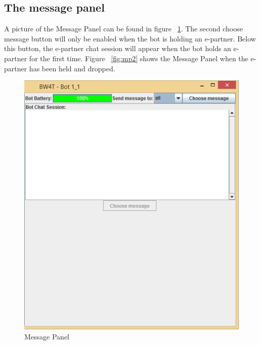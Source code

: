 \subsection{The message panel}
A picture of the Message Panel can be found in figure ~\ref{fig:mp1}. The second choose message button will only be enabled when the bot is holding an e-partner. Below this button, the e-partner chat session will appear when the bot holds an e-partner for the first time. Figure ~\ref{fig:mp2} shows the Message Panel when the e-partner has been held and dropped.
\\
\begin{figure}[h]
\begin{center}
\includegraphics{NewFeatures/hpg-right.png}
\end{center}
\caption{Message Panel}
\label{fig:mp1}
\end{figure}

